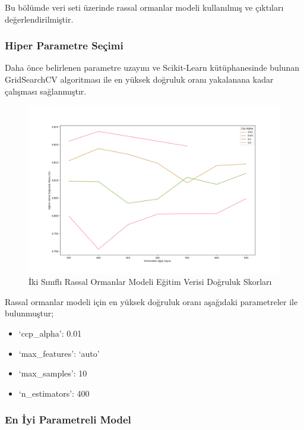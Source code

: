 \documentclass[12pt,twoside]{deuthesis}
\providecommand{\tightlist}{%
  \setlength{\itemsep}{0pt}\setlength{\parskip}{0pt}}
\begin{document}
Bu bölümde veri seti üzerinde rassal ormanlar modeli kullanılmış ve çıktıları değerlendirilmiştir.

\hypertarget{hiper-parametre-seuxe7imi-5}{%
\subsubsection{Hiper Parametre Seçimi}\label{hiper-parametre-seuxe7imi-5}}

Daha önce belirlenen parametre uzayını ve Scikit-Learn kütüphanesinde bulunan GridSearchCV algoritması ile en yüksek doğruluk oranı yakalanana kadar çalışması sağlanmıştır.
\begin{figure}

{\centering \includegraphics[width=1.1\linewidth,height=0.55\textheight]{figure/RF_bin_Grid_Graph} 

}

\caption{İki Sınıflı Rassal Ormanlar Modeli Eğitim Verisi Doğruluk Skorları}\label{fig:unnamed-chunk-62}
\end{figure}
Rassal ormanlar modeli için en yüksek doğruluk oranı aşağıdaki parametreler ile bulunmuştur;
\begin{itemize}
\tightlist
\item
  `ccp\_alpha': 0.01\\
\item
  `max\_features': `auto'\\
\item
  `max\_samples': 10\\
\item
  `n\_estimators': 400\\
  \newpage  
\end{itemize}
\hypertarget{en-iyi-parametreli-model-3}{%
\subsubsection{En İyi Parametreli Model}\label{en-iyi-parametreli-model-3}}
\end{document}
